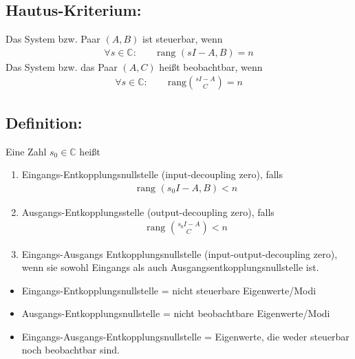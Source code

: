 \documentclass[ngerman]{tudscrreprt}
\begin{document}
\subsection*{Hautus-Kriterium:} Das System bzw. Paar $(A,B)$ ist steuerbar, wenn \begin{align*}
\forall s \in \mathbb{C}: \qquad \text{rang }(sI - A, B) = n
\end{align*}
Das System bzw. das Paar $(A,C)$ heißt beobachtbar, wenn \begin{align*}
\forall s\in \mathbb{C}: \qquad \text{rang}\binom{sI-A}{C} = n
\end{align*}
\subsection*{Definition:} Eine Zahl $s_0 \in \mathbb{C}$ heißt 
\begin{enumerate}
\item Eingangs-Entkopplungsnullstelle (input-decoupling zero), falls \begin{align*} \text{rang }(s_0I - A, B) < n \end{align*} 
\item Ausgangs-Entkopplungsstelle (output-decoupling zero), falls \begin{align*}
\text{rang }\binom{s_0 I -A}{C} < n
\end{align*}
\item Eingangs-Ausgangs Entkopplungsnullstelle (input-output-decoupling zero), wenn sie sowohl Eingangs als auch Ausgangsentkopplungsnullstelle ist.
\end{enumerate}
\begin{itemize}
\item Eingangs-Entkopplungsnullstelle = nicht steuerbare Eigenwerte/Modi
\item Ausgangs-Entkopplungsnullstelle = nicht beobachtbare Eigenwerte/Modi
\item Eingangs-Ausgangs-Entkopplungsnullstelle = Eigenwerte, die weder steuerbar noch beobachtbar sind.
\end{itemize}
\end{document}
